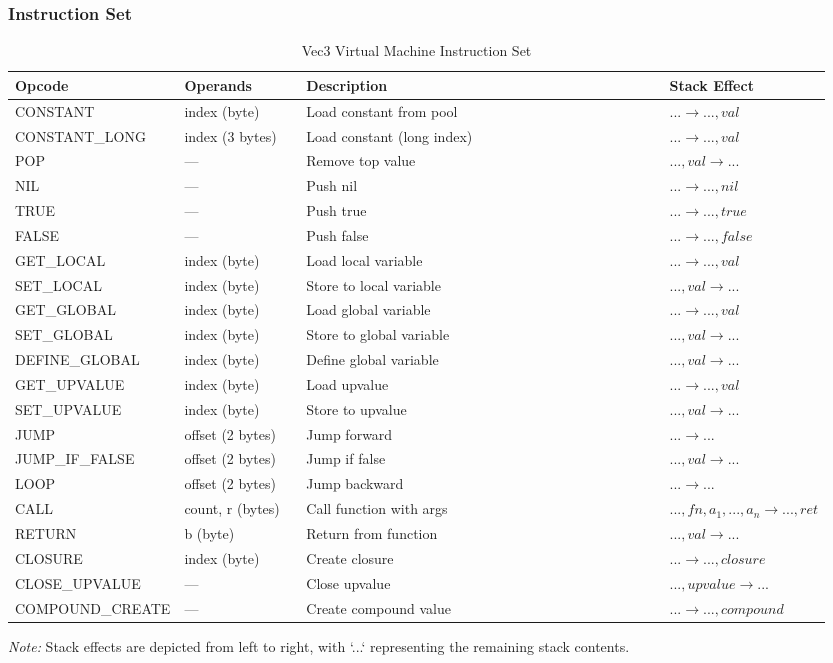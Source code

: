 \subsubsection{Instruction Set}

\begin{table}[h]
\caption{Vec3 Virtual Machine Instruction Set}
\label{tab:instruction-set}
\begin{tabular}{>{\ttfamily}p{0.2\linewidth} p{0.15\linewidth} p{0.45\linewidth} p{0.15\linewidth}}
\toprule
Opcode & Operands & Description & Stack Effect \\ 
\midrule
CONSTANT & index (byte) & Load constant from pool & $... \rightarrow ..., val$ \\
CONSTANT_LONG & index (3 bytes) & Load constant (long index) & $... \rightarrow ..., val$ \\
POP & --- & Remove top value & $..., val \rightarrow ...$ \\
NIL & --- & Push nil & $... \rightarrow ..., nil$ \\
TRUE & --- & Push true & $... \rightarrow ..., true$ \\
FALSE & --- & Push false & $... \rightarrow ..., false$ \\
GET_LOCAL & index (byte) & Load local variable & $... \rightarrow ..., val$ \\
SET_LOCAL & index (byte) & Store to local variable & $..., val \rightarrow ...$ \\
GET_GLOBAL & index (byte) & Load global variable & $... \rightarrow ..., val$ \\
SET_GLOBAL & index (byte) & Store to global variable & $..., val \rightarrow ...$ \\
DEFINE_GLOBAL & index (byte) & Define global variable & $..., val \rightarrow ...$ \\
GET_UPVALUE & index (byte) & Load upvalue & $... \rightarrow ..., val$ \\
SET_UPVALUE & index (byte) & Store to upvalue & $..., val \rightarrow ...$ \\
JUMP & offset (2 bytes) & Jump forward & $... \rightarrow ...$ \\
JUMP_IF_FALSE & offset (2 bytes) & Jump if false & $..., val \rightarrow ...$ \\
LOOP & offset (2 bytes) & Jump backward & $... \rightarrow ...$ \\
CALL & count, r (bytes) & Call function with args & $..., fn, a_1, ..., a_n \rightarrow ..., ret$ \\
RETURN & b (byte) & Return from function & $..., val \rightarrow ...$ \\
CLOSURE & index (byte) & Create closure & $... \rightarrow ..., closure$ \\
CLOSE_UPVALUE & --- & Close upvalue & $..., upvalue \rightarrow ...$ \\
COMPOUND_CREATE & --- & Create compound value & $... \rightarrow ..., compound$ \\
\bottomrule
\end{tabular}
\end{table}
\textit{Note:} Stack effects are depicted from left to right, with `...` representing the remaining stack contents.

